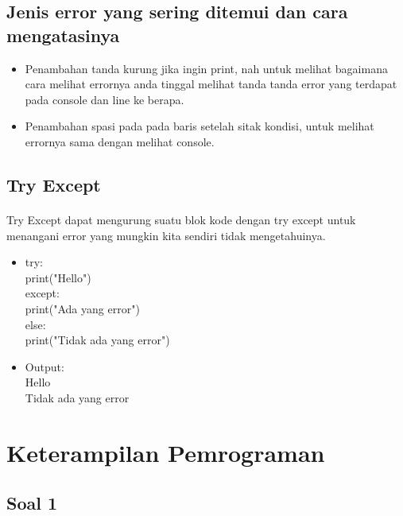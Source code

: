 \documentclass{article}
\begin{document}
    \subsection{Jenis error yang sering ditemui dan cara mengatasinya}    
        \begin{itemize}
            \item Penambahan tanda kurung jika ingin print, nah untuk melihat bagaimana cara melihat errornya anda tinggal melihat tanda tanda error yang terdapat pada console dan line ke berapa.
            \item Penambahan spasi pada pada baris setelah sitak kondisi, untuk melihat errornya sama dengan melihat console.
        \end{itemize}
    
        \subsection{Try Except}
            \paragraph{} Try Except dapat mengurung suatu blok kode dengan try except untuk menangani error yang mungkin kita sendiri tidak mengetahuinya.
                \begin{itemize}
                    \item   try:\\
                              print("Hello")\\
                            except:\\
                              print("Ada yang error")\\
                            else:\\
                              print("Tidak ada yang error") \\
                    \item   Output:\\
                            Hello\\
                            Tidak ada yang error
                \end{itemize}
                
\section{Keterampilan Pemrograman}
    \subsection{Soal 1}
        
\end{document}
